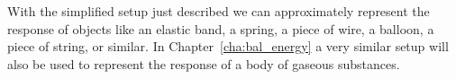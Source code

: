 \documentclass[a4paper,12pt,%
onecolumn,oneside,%
british%
]{memoir}
\renewcommand*{\|}[1][]{\nonscript\:#1\vert\nonscript\:\mathopen{}}
\newcommand*{\chap}{Chapter}%
\begin{document}
%
%
With the simplified setup just described we can approximately represent the response of objects like an elastic band, a spring, a piece of wire, a balloon, a piece of string, or similar. In \chap~\ref{cha:bal_energy} a very similar setup will also be used to represent the response of a body of gaseous substances.
\end{document}
